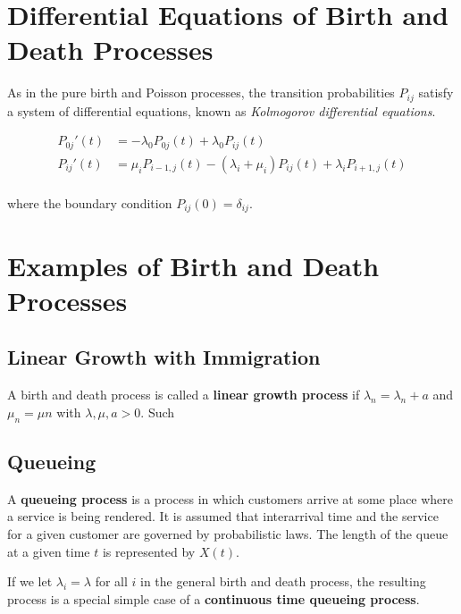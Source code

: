 \documentclass[12pt]{article}
\theoremstyle{nonumberbreak}
\begin{document}
\section{Differential Equations of Birth and Death Processes}

As in the pure birth and Poisson processes, the transition probabilities $P_{ij}$ satisfy a system of differential equations, known as \textit{Kolmogorov differential equations}. 

$$
\begin{aligned}
P_{0j}'(t) &= -\lambda_0 P_{0j} (t) + \lambda_0 P_{ij}(t) \\[8pt]
P_{ij}'(t) &= \mu_i P_{i-1, j} (t) - (\lambda_i + \mu_i) P_{ij}(t) + \lambda_i P_{i+1, j}(t) \\[8pt]
\end{aligned}
$$

where the boundary condition $P_{ij}(0) = \delta_{ij}$. 



\section{Examples of Birth and Death Processes}

\subsection{Linear Growth with Immigration}

A birth and death process is called a \textbf{linear growth process} if $\lambda_n = \lambda_n + a$ and $\mu_n = \mu n$ with $\lambda, \mu, a >0$. Such 



\subsection{Queueing}

A \textbf{queueing process} is a process in which customers arrive at some place where a service is being rendered. It is assumed that interarrival time and the service for a given customer are governed by probabilistic laws. The length of the queue at a given time $t$ is represented by $X(t)$. 

If we let $\lambda_i = \lambda$ for all $i$ in the general birth and death process, the resulting process is a special simple case of a \textbf{continuous time queueing process}. 
\end{document}
